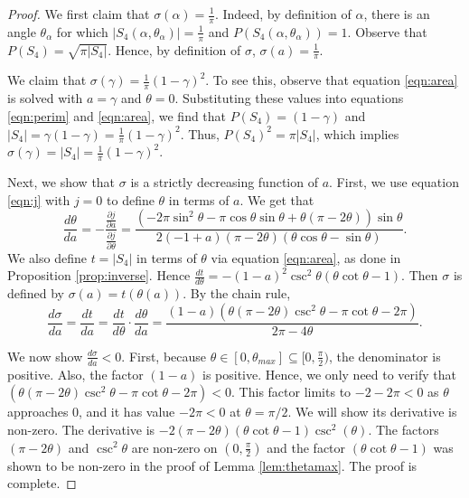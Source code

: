 \documentclass[leqno]{article}
\numberwithin{equation}{section}
\theoremstyle{definition}
\theoremstyle{remark}
\theoremstyle{plain}
\begin{document}
\begin{proof}  We first claim that $\sigma(\alpha) = \frac{1}{\pi}$.  Indeed, by definition of $\alpha$, there is an angle $\theta_\alpha$ for which $|S_4(\alpha,\theta_{\alpha})| = \frac{1}{\pi}$ and $P(S_4(\alpha,\theta_{\alpha})) = 1$.  Observe that $P(S_4) = \sqrt{\pi |S_4|}$. Hence, by definition of $\sigma$, $\sigma(a) = \frac{1}{\pi}$.

We claim that $\sigma(\gamma) = \frac{1}{\pi}(1-\gamma)^2$.  To see this, observe that equation \eqref{eqn:area} is solved with $a = \gamma$ and $\theta = 0$.  Substituting these values into equations \eqref{eqn:perim} and \eqref{eqn:area}, we find that $P(S_4) = (1-\gamma)$ and $|S_4| = \gamma(1-\gamma) = \frac{1}{\pi}(1-\gamma)^2$.  Thus, $P(S_4)^2 = \pi |S_4|$, which implies $\sigma(\gamma) = |S_4| = \frac{1}{\pi}(1-\gamma)^2$.

Next, we show that $\sigma$ is a strictly decreasing function of $a$.   First, we use equation \eqref{eqn:j} with $j=0$ to define $\theta$ in terms of $a$.  We get that $$\frac{d\theta}{da} = -\frac{\frac{\partial j}{\partial a}}{\frac{\partial j}{\partial \theta}} = \frac{(-2\pi \sin^2\theta - \pi\cos\theta\sin\theta + \theta(\pi - 2\theta))\sin\theta}{2(-1 + a)(\pi - 2\theta)(\theta\cos\theta - \sin\theta)}.$$  We also define $t = |S_4|$ in terms of $\theta$ via equation \eqref{eqn:area}, as done in Proposition \ref{prop:inverse}. Hence $\frac{dt}{d\theta} = -(1-a)^2 \csc^2 \theta (\theta \cot\theta-1)$. Then $\sigma$ is defined by $\sigma(a) = t(\theta(a))$. By the chain rule, $$\frac{d\sigma}{da} = \frac{dt}{da} = \frac{dt}{d\theta}\cdot\frac{d\theta}{da} = \frac{(1 - a)(\theta(\pi - 2\theta)\csc^2\theta - \pi\cot\theta - 2\pi)}{2\pi - 4\theta}.$$

We now show $\frac{d\sigma}{da} < 0$.  First, because $\theta \in [0,\theta_{max}]\subseteq [0,\tfrac{\pi}{2})$, the denominator is positive.  Also, the factor $(1-a)$ is positive. Hence, we only need to verify that $(\theta(\pi - 2\theta)\csc^2\theta - \pi\cot\theta - 2\pi)<0.$  This factor limits to $-2-2\pi < 0$ as $\theta$ approaches $0$, and it has value $-2\pi < 0$ at $\theta = \pi/2$. We will show its derivative is non-zero. The derivative is $-2(\pi-2\theta)(\theta\cot\theta-1)\csc^2(\theta)$. The factors $(\pi-2\theta)$ and $\csc^2\theta$ are non-zero on $(0,\tfrac{\pi}{2})$ and the factor $(\theta\cot\theta - 1)$ was shown to be non-zero in the proof of Lemma \ref{lem:thetamax}. The proof is complete.

\end{proof}
\end{document}

